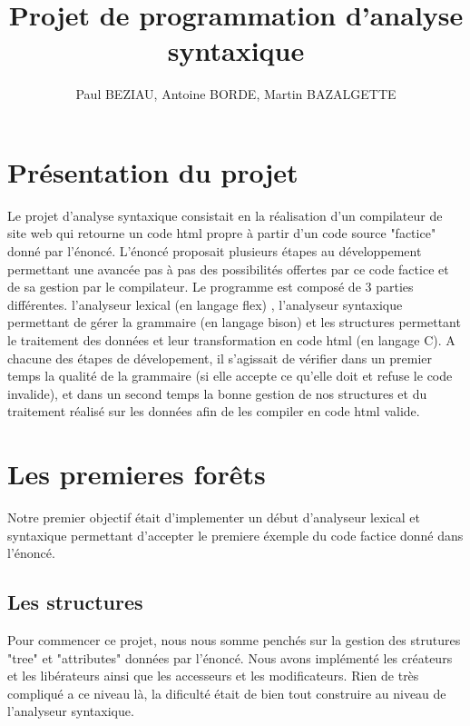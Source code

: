 \documentclass[12pt]{article}
\begin{document}
\title{Projet de programmation d'analyse syntaxique}
\author{Paul BEZIAU, Antoine BORDE, Martin BAZALGETTE}

\maketitle
\newpage
\tableofcontents
\newpage


\section{Présentation du projet}
Le projet d'analyse syntaxique consistait en la réalisation d'un compilateur
de site web qui retourne un code html propre à partir d'un code source "factice"
donné par l'énoncé.
\newline
L'énoncé proposait plusieurs étapes au développement permettant une avancée
pas à pas des possibilités offertes par ce code factice et de sa gestion
par le compilateur.
\newline
Le programme est composé de 3 parties différentes. l'analyseur lexical (en langage flex) ,
l'analyseur syntaxique permettant de gérer la grammaire (en langage bison) et les structures
permettant le traitement des données et leur transformation en code html (en langage C).
\newline
A chacune des étapes de dévelopement, il s'agissait de vérifier dans un premier
temps la qualité de la grammaire (si elle accepte ce qu'elle doit et refuse
le code invalide), et dans un second temps la bonne gestion de nos structures
et du traitement réalisé sur les données afin de les compiler en code html valide.

\newpage

\section{Les premieres forêts}

Notre premier objectif était d'implementer un début d'analyseur lexical et syntaxique
permettant d'accepter le premiere éxemple du code factice donné dans l'énoncé.

\subsection{Les structures}

Pour commencer ce projet, nous nous somme penchés sur la gestion des strutures
"tree" et "attributes" données par l'énoncé. Nous avons implémenté les créateurs et les
libérateurs ainsi que les accesseurs et les modificateurs. Rien de très compliqué a ce niveau
là, la dificulté était de bien tout construire au niveau de l'analyseur syntaxique.
\end{document}
